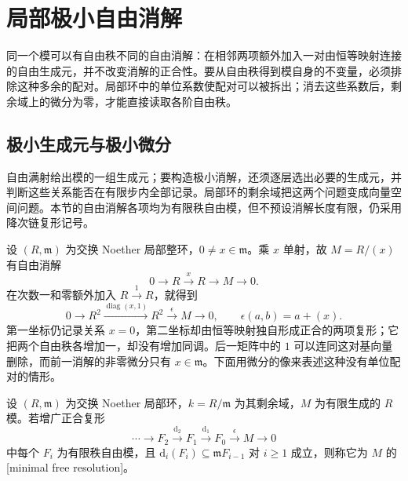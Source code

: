 
\section{局部极小自由消解}
\label{b3:sec:1701}

同一个模可以有自由秩不同的自由消解：在相邻两项额外加入一对由恒等映射连接的自由生成元，并不改变消解的正合性。要从自由秩得到模自身的不变量，必须排除这种多余的配对。局部环中的单位系数使配对可以被拆出；消去这些系数后，剩余域上的微分为零，才能直接读取各阶自由秩。

%
%

\subsection{极小生成元与极小微分}
\label{b3:subsec:1701:01}

自由满射给出模的一组生成元；要构造极小消解，还须逐层选出必要的生成元，并判断这些关系能否在有限步内全部记录。局部环的剩余域把这两个问题变成向量空间问题。本节的自由消解各项均为有限秩自由模，但不预设消解长度有限，仍采用降次链复形记号。

\ProseParagraphBreak
设 \((R,\mathfrak m)\) 为交换 Noether 局部整环，\(0\ne x\in\mathfrak m\)。乘 \(x\) 单射，故 \(M=R/(x)\) 有自由消解
\[
	0\longrightarrow R\xrightarrow{x}R\longrightarrow M\longrightarrow0.
\]
在次数一和零额外加入 \(R\xrightarrow{1}R\)，就得到
\[
	0\longrightarrow R^2\xrightarrow{\operatorname{diag}(x,1)}R^2 \xrightarrow{\epsilon}M\longrightarrow0, \qquad \epsilon(a,b)=a+(x).
\]
第一坐标仍记录关系 \(x=0\)，第二坐标却由恒等映射独自形成正合的两项复形；它把两个自由秩各增加一，却没有增加同调。后一矩阵中的 \(1\) 可以连同这对基向量删除，而前一消解的非零微分只有 \(x\in\mathfrak m\)。下面用微分的像来表述这种没有单位配对的情形。

\begin{definition}\label{b3:def:minimal-free-resolution}
	设 \((R,\mathfrak m)\) 为交换 Noether 局部环，\(k=R/\mathfrak m\) 为其剩余域，\(M\) 为有限生成的 \(R\) 模。若增广正合复形
	\[
		\cdots\longrightarrow F_2\xrightarrow{\mathrm{d}_2}F_1 \xrightarrow{\mathrm{d}_1}F_0\xrightarrow{\epsilon}M\longrightarrow0
	\]
	中每个 \(F_i\) 为有限秩自由模，且 \(\mathrm{d}_i(F_i)\subseteq\mathfrak mF_{i-1}\) 对 \(i\ge1\) 成立，则称它为 \(M\) 的[minimal free resolution]。
\end{definition}

